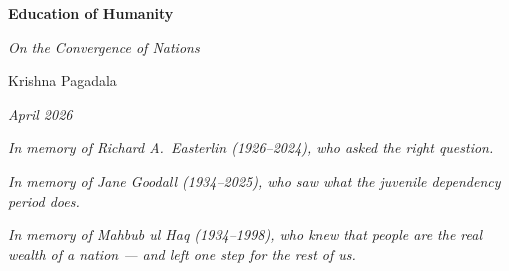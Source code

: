 \documentclass[12pt,letterpaper]{article}
\begin{document}
\begin{titlepage}
\begin{center}
\vspace*{2cm}
{\LARGE\bfseries Education of Humanity\par}
\vspace{0.5cm}
{\large\itshape On the Convergence of Nations\par}
\vspace{1.5cm}
{\large Krishna Pagadala\par}
\vspace{0.5cm}
{\normalsize\itshape April 2026\par}
\vspace{1cm}
{\small\itshape In memory of Richard A.\ Easterlin (1926--2024), who asked the right question.\par}
\vspace{0.5cm}
{\small\itshape In memory of Jane Goodall (1934--2025), who saw what the juvenile dependency period does.\par}
\vspace{0.5cm}
{\small\itshape In memory of Mahbub ul Haq (1934--1998), who knew that people are the real wealth of a nation --- and left one step for the rest of us.\par}
\vspace{1cm}
\end{center}

\begin{abstract}
\noindent Humans have the longest juvenile dependency of any species
--- nearly two decades of plastic brain embedded with dedicated adult
teachers. This is the substrate for cultural transmission. Cultural
transmission is not uniquely human; elephants, orcas, and apes all
transmit learned behaviour. What is uniquely human is cultural
transmission applied to tools that rebuild the environment, and to
the specialisation of individuals across them. Fire was the first;
agriculture, metallurgy, literacy, and medicine followed --- each a
culturally-transmitted tool that manipulates the environment at a
scale no individual could invent alone. Formal schooling is the
latest and highest-bandwidth payload ever delivered through this
channel.

This paper argues that education is the necessary and sufficient
cause of human development, and tests the claim against a 185-country
panel (1950--2015) across three generational depths. The biological
prediction --- that an educated parent transmits norms, health
behaviours, and the expectation of school completion to children who
exercise these as household decisions \textasciitilde25 years later
--- is what the panel confirms. By 2022, 154 countries have crossed
both development thresholds (TFR below 3.65, life expectancy above
69.8 --- the 1960 United States values). Every one through
education.


\end{abstract}
\end{titlepage}
\end{document}
